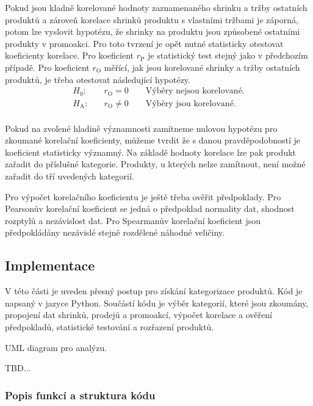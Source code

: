 Pokud jsou kladně korelované hodnoty zaznamenaného shrinku a tržby ostatních produktů a zároveň korelace shrinků produktu s vlastními tržbami je záporná, potom lze vyslovit hypotézu, že shrinky na produktu jsou způsobené ostatními produkty v promoakci.
Pro toto tvrzení je opět nutné statisticky otestovat koeficienty korelace. Pro koeficient $r_\mathrm{P}$ je statistický test stejný jako v předchozím případě. Pro koeficient $r_\mathrm{O}$ měřící, jak jsou korelované shrinky a tržby ostatních produktů, je třeba otestovat následující hypotézy.
\begin{equation*}
    \begin{aligned}
        H_\mathrm{0}: \quad & r_\mathrm{O} = 0 \qquad \mbox{Výběry nejsou korelované.}  \\
        H_\mathrm{A}: \quad & r_\mathrm{O} \neq 0 \qquad\mbox{Výběry jsou korelované.}\\
    \end{aligned}
\end{equation*}

Pokud na zvolené hladině významnosti zamítneme nulovou hypotézu pro zkoumané korelační koeficienty, můžeme tvrdit že s danou pravděpodobností je koeficient statisticky významný. Na základě hodnoty korelace lze pak produkt zařadit do příslušné kategorie. Produkty, u kterých nelze zamítnout, není možné zařadit do tří uvedených kategorií.

Pro výpočet korelačního koeficientu je ještě třeba ověřit předpoklady. Pro Pearsonův korelační koeficient se jedná o předpoklad normality dat, shodnost rozptylů a nezávislost dat. Pro Spearmanův korelační koeficient jsou předpokládány nezávislé stejně rozdělené náhodné veličiny.

\subsection{Implementace}

V této části je uveden přesný postup pro získání kategorizace produktů. Kód je napsaný v jazyce Python. Součástí kódu je výběr kategorií, které jsou zkoumány, propojení dat shrinků, prodejů a promoakcí, výpočet korelace a ověření předpokladů, statistické testování a rozřazení produktů.

UML diagram pro analýzu.

TBD...

\subsubsection*{Popis funkcí a struktura kódu}

